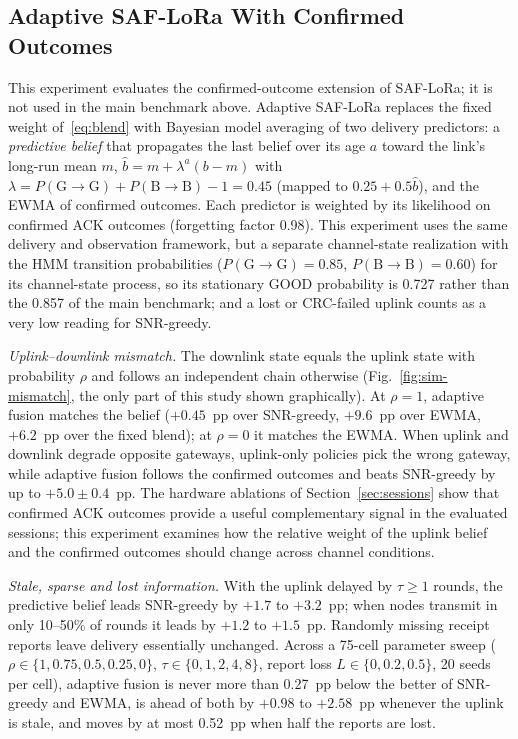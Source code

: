 \documentclass[journal]{IEEEtran}
\begin{document}
\subsection{Adaptive SAF-LoRa With Confirmed Outcomes}
\label{sec:sim-robust}
This experiment evaluates the confirmed-outcome extension of SAF-LoRa; it is not used in the main benchmark above. Adaptive SAF-LoRa replaces the fixed weight of~\eqref{eq:blend} with Bayesian model averaging of two delivery predictors: a \emph{predictive belief} that propagates the last belief over its age $a$ toward the link's long-run mean $m$, $\hat b=m+\lambda^{a}(b-m)$ with $\lambda=P(\text{G}\to\text{G})+P(\text{B}\to\text{B})-1=0.45$ (mapped to $0.25+0.5\hat b$), and the EWMA of confirmed outcomes. Each predictor is weighted by its likelihood on confirmed ACK outcomes (forgetting factor 0.98). This experiment uses the same delivery and observation framework, but a separate channel-state realization with the HMM transition probabilities ($P(\text{G}\!\to\!\text{G})=0.85$, $P(\text{B}\!\to\!\text{B})=0.60$) for its channel-state process, so its stationary GOOD probability is 0.727 rather than the 0.857 of the main benchmark; and a lost or CRC-failed uplink counts as a very low reading for SNR-greedy.

\textit{Uplink--downlink mismatch.} The downlink state equals the uplink state with probability $\rho$ and follows an independent chain otherwise (Fig.~\ref{fig:sim-mismatch}, the only part of this study shown graphically). At $\rho=1$, adaptive fusion matches the belief ($+0.45$~pp over SNR-greedy, $+9.6$~pp over EWMA, $+6.2$~pp over the fixed blend); at $\rho=0$ it matches the EWMA. When uplink and downlink degrade opposite gateways, uplink-only policies pick the wrong gateway, while adaptive fusion follows the confirmed outcomes and beats SNR-greedy by up to $+5.0\pm0.4$~pp. The hardware ablations of Section~\ref{sec:sessions} show that confirmed ACK outcomes provide a useful complementary signal in the evaluated sessions; this experiment examines how the relative weight of the uplink belief and the confirmed outcomes should change across channel conditions.

\textit{Stale, sparse and lost information.} With the uplink delayed by $\tau\ge1$ rounds, the predictive belief leads SNR-greedy by $+1.7$ to $+3.2$~pp; when nodes transmit in only 10--50\% of rounds it leads by $+1.2$ to $+1.5$~pp. Randomly missing receipt reports leave delivery essentially unchanged. Across a 75-cell parameter sweep ($\rho\in\{1,0.75,0.5,0.25,0\}$, $\tau\in\{0,1,2,4,8\}$, report loss $L\in\{0,0.2,0.5\}$, 20 seeds per cell), adaptive fusion is never more than 0.27~pp below the better of SNR-greedy and EWMA, is ahead of both by $+0.98$ to $+2.58$~pp whenever the uplink is stale, and moves by at most 0.52~pp when half the reports are lost.
\end{document}

